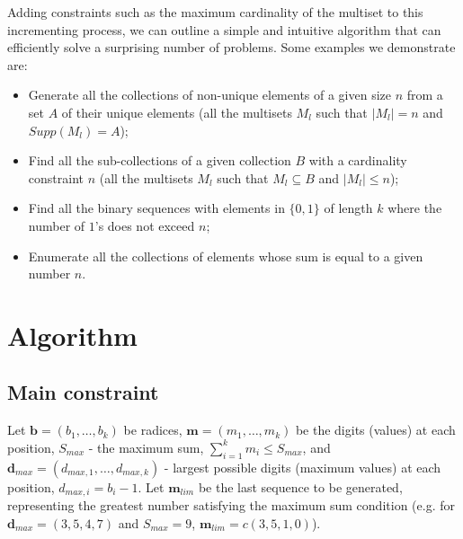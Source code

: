 \documentclass[12pt]{article}
\begin{document}
Adding constraints such as the maximum cardinality of the multiset to this incrementing process, we can outline a simple and intuitive algorithm that can efficiently solve a surprising number of problems. Some examples we demonstrate are:
\begin{itemize}
  \item Generate all the collections of non-unique elements of a given size $n$ from a set $A$ of their unique elements (all the multisets $M_l$ such that $|M_l| = n$ and $Supp(M_l) = A$);
  \item Find all the sub-collections of a given collection $B$ with a cardinality constraint $n$ (all the multisets $M_l$ such that $M_l \subseteq B$ and $|M_l| \leqslant n$);
  \item Find all the binary sequences with elements in $\{0, 1\}$ of length $k$ where the number of $1$'s does not exceed $n$; 
  \item Enumerate all the collections of elements whose sum is equal to a given number $n$.
\end{itemize}

\section{Algorithm}
\subsection{Main constraint}

Let $\boldsymbol{b} = (b_1, \dotsc, b_k)$ be radices, $\boldsymbol{m} = (m_1, \dotsc, m_k)$ be the digits (values) at each position, $S_{max}$ - the maximum sum, $\sum_{i = 1}^{k} m_i \leqslant S_{max}$, and $\boldsymbol{d}_{max} = (d_{max, 1}, \dotsc, d_{max, k})$ - largest possible digits (maximum values) at each position, $d_{max, i} = b_i - 1$. Let $\boldsymbol{m}_{lim}$ be the last sequence to be generated, representing the greatest number satisfying the maximum sum condition (e.g. for $\boldsymbol{d}_{max} = (3, 5, 4, 7)$ and $S_{max} = 9$, $\boldsymbol{m}_{lim} = c(3, 5, 1, 0)$). \\ 
\end{document}
